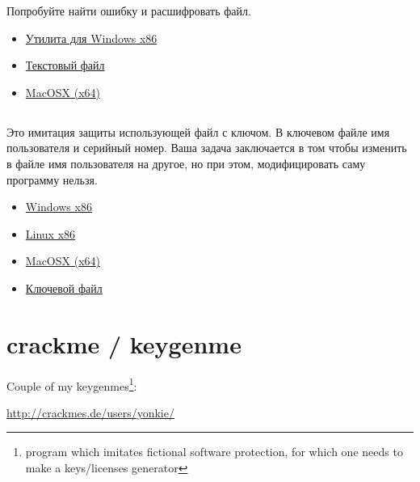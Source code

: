 Попробуйте найти ошибку и расшифровать файл.

\begin{itemize}
\item
\href{http://yurichev.com/RE-exercises/middle/4/amateur_cryptor.exe}{Утилита для Windows x86}

\item
\href{http://yurichev.com/RE-exercises/middle/4/text_encrypted}{Текстовый файл}

\item
\href{http://yurichev.com/RE-exercises/middle/3/unknown_utility_2_3_MacOSX.tar}{MacOSX (x64)}
\end{itemize}

\subsection{}

Это имитация защиты использующей файл с ключом. В ключевом файле имя пользователя и серийный номер.
Ваша задача заключается в том чтобы изменить в файле имя пользователя на другое, но при этом, модифицировать
саму программу нельзя.

\begin{itemize}
\item
\href{http://yurichev.com/RE-exercises/middle/5/super_mega_protection.exe}{Windows x86}

\item
\href{http://yurichev.com/RE-exercises/middle/5/super_mega_protection.tar}{Linux x86}

\item
\href{http://yurichev.com/RE-exercises/middle/5/super_mega_protection_MacOSX.tar}{MacOSX (x64)}

\item
\href{http://yurichev.com/RE-exercises/middle/5/sample.key}{Ключевой файл}
\end{itemize}

\section{crackme / keygenme}

{Couple of my keygenmes\footnote{program which imitates fictional software protection, 
for which one needs to make a keys/licenses generator}:}

\url{http://crackmes.de/users/yonkie/}

